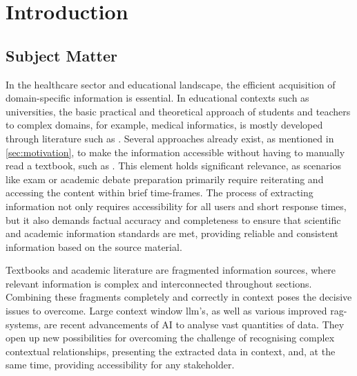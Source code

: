 \chapter{Introduction}\label{ch:introduction}
\section{Subject Matter}\label{sec:subject matter}
In the healthcare sector and educational landscape, the efficient acquisition of domain-specific information is essential. 
In educational contexts such as universities, the basic practical and theoretical approach of students and teachers to complex domains, for example, medical informatics, is mostly developed through literature such as \citet{bb2}.
%
Several approaches already exist, as mentioned in \cref{sec:motivation}, to make the information accessible without having to manually read a textbook, such as \citet{bb2}.
This element holds significant relevance, as scenarios like exam or academic debate preparation primarily require reiterating and accessing the content within brief time-frames.
%
The process of extracting information not only requires accessibility for all users and short response times, but it also demands factual accuracy and completeness to ensure that scientific and academic information standards are met, providing reliable and consistent information based on the source material.
 
Textbooks and academic literature are fragmented information sources, where relevant information is complex and interconnected throughout sections. 
Combining these fragments completely and correctly in context poses the decisive issues to overcome. 
%
Large context window \ac{llm}'s, as well as various improved \ac{rag}-systems, are recent advancements of AI to analyse vast quantities of data.
They open up new possibilities for overcoming the challenge of recognising complex contextual relationships, presenting the extracted data in context, and, at the same time, providing accessibility for any stakeholder.

